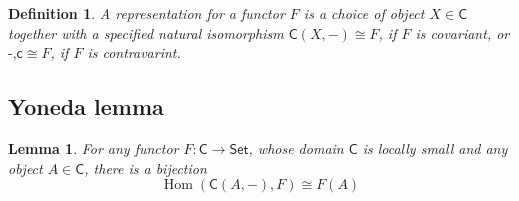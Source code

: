 \documentclass{article}
\newtheorem{lemma}[theorem]{Lemma}
\newtheorem{definition}[theorem]{Definition}
\newcommand*{\cat}[1]{\textsf{#1}\xspace}
\newcommand{\Set}{\textsf{Set}\xspace}
\DeclareMathOperator{\Hom}{Hom}
\begin{document}
\begin{definition}
\rm A representation for a functor $F$ is a choice of object $X \in \cat{C}$ together with a specified natural isomorphism $\cat{C}(X,-) \cong F$, if $F$ is covariant, or $\cat{-,c} \cong F$, if $F$ is contravarint. 
\end{definition}

\newpage
\subsection{Yoneda lemma}

\begin{lemma}
\rm For any functor $F: \cat{C} \to \Set$, whose domain $\cat{C}$ is locally small and any object $A \in \cat{C}$, there is a bijection 
$$
\Hom(\cat{C}(A,-),F) \cong F(A)
$$
\end{lemma}
\end{document}
